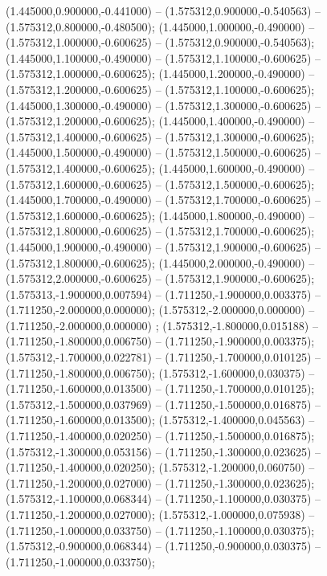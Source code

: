  (1.445000,0.900000,-0.441000) -- (1.575312,0.900000,-0.540563) -- (1.575312,0.800000,-0.480500);
 (1.445000,1.000000,-0.490000) -- (1.575312,1.000000,-0.600625) -- (1.575312,0.900000,-0.540563);
 (1.445000,1.100000,-0.490000) -- (1.575312,1.100000,-0.600625) -- (1.575312,1.000000,-0.600625);
 (1.445000,1.200000,-0.490000) -- (1.575312,1.200000,-0.600625) -- (1.575312,1.100000,-0.600625);
 (1.445000,1.300000,-0.490000) -- (1.575312,1.300000,-0.600625) -- (1.575312,1.200000,-0.600625);
 (1.445000,1.400000,-0.490000) -- (1.575312,1.400000,-0.600625) -- (1.575312,1.300000,-0.600625);
 (1.445000,1.500000,-0.490000) -- (1.575312,1.500000,-0.600625) -- (1.575312,1.400000,-0.600625);
 (1.445000,1.600000,-0.490000) -- (1.575312,1.600000,-0.600625) -- (1.575312,1.500000,-0.600625);
 (1.445000,1.700000,-0.490000) -- (1.575312,1.700000,-0.600625) -- (1.575312,1.600000,-0.600625);
 (1.445000,1.800000,-0.490000) -- (1.575312,1.800000,-0.600625) -- (1.575312,1.700000,-0.600625);
 (1.445000,1.900000,-0.490000) -- (1.575312,1.900000,-0.600625) -- (1.575312,1.800000,-0.600625);
 (1.445000,2.000000,-0.490000) -- (1.575312,2.000000,-0.600625) -- (1.575312,1.900000,-0.600625);
 (1.575313,-1.900000,0.007594) -- (1.711250,-1.900000,0.003375) -- (1.711250,-2.000000,0.000000);
 (1.575312,-2.000000,0.000000) -- (1.711250,-2.000000,0.000000) ;
 (1.575312,-1.800000,0.015188) -- (1.711250,-1.800000,0.006750) -- (1.711250,-1.900000,0.003375);
 (1.575312,-1.700000,0.022781) -- (1.711250,-1.700000,0.010125) -- (1.711250,-1.800000,0.006750);
 (1.575312,-1.600000,0.030375) -- (1.711250,-1.600000,0.013500) -- (1.711250,-1.700000,0.010125);
 (1.575312,-1.500000,0.037969) -- (1.711250,-1.500000,0.016875) -- (1.711250,-1.600000,0.013500);
 (1.575312,-1.400000,0.045563) -- (1.711250,-1.400000,0.020250) -- (1.711250,-1.500000,0.016875);
 (1.575312,-1.300000,0.053156) -- (1.711250,-1.300000,0.023625) -- (1.711250,-1.400000,0.020250);
 (1.575312,-1.200000,0.060750) -- (1.711250,-1.200000,0.027000) -- (1.711250,-1.300000,0.023625);
 (1.575312,-1.100000,0.068344) -- (1.711250,-1.100000,0.030375) -- (1.711250,-1.200000,0.027000);
 (1.575312,-1.000000,0.075938) -- (1.711250,-1.000000,0.033750) -- (1.711250,-1.100000,0.030375);
 (1.575312,-0.900000,0.068344) -- (1.711250,-0.900000,0.030375) -- (1.711250,-1.000000,0.033750);
